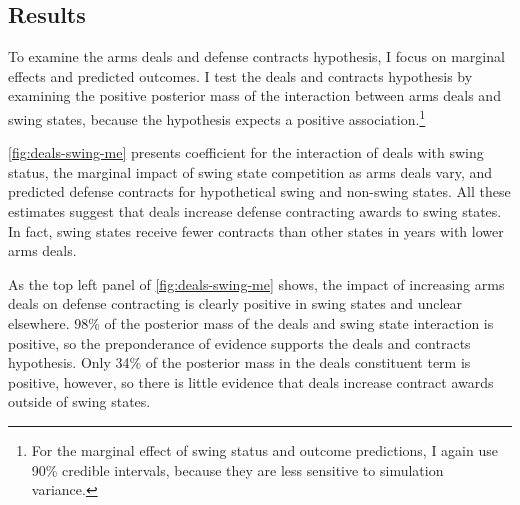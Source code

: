 \documentclass[12pt]{article}
\begin{document}


\subsection{Results}


To examine the arms deals and defense contracts hypothesis, I focus on marginal effects and predicted outcomes.
I test the deals and contracts hypothesis by examining the positive posterior mass of the interaction between arms deals and swing states, because the hypothesis expects a positive association.\footnote{For the marginal effect of swing status and outcome predictions, I again use 90\% credible intervals, because they are less sensitive to simulation variance.}


\autoref{fig:deals-swing-me} presents coefficient for the interaction of deals with swing status, the marginal impact of swing state competition as arms deals vary, and predicted defense contracts for hypothetical swing and non-swing states. 
All these estimates suggest that deals increase defense contracting awards to swing states. 
In fact, swing states receive fewer contracts than other states in years with lower arms deals. 


As the top left panel of \autoref{fig:deals-swing-me} shows, the impact of increasing arms deals on defense contracting is clearly positive in swing states and unclear elsewhere.
98\% of the posterior mass of the deals and swing state interaction is positive, so the preponderance of evidence supports the deals and contracts hypothesis.
Only 34\% of the posterior mass in the deals constituent term is positive, however, so there is little evidence that deals increase contract awards outside of swing states. 
\end{document}
